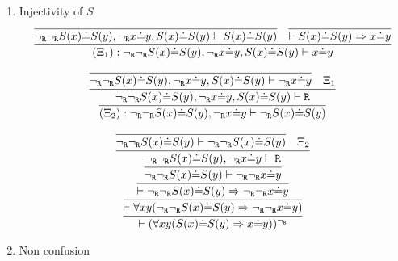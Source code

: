 \begin{enumerate}
    \item Injectivity of $S$
    $$    
                                \infer{
                                    (\Xi_1) : \ngr\ngr S(x)\dot{=}S(y), \ngr x\dot{=}y, S(x)\dot{=}S(y)  \vdash x\dot{=}y
                                }{
                                    \infer{
                                        \ngr\ngr S(x)\dot{=}S(y), \ngr x\dot{=}y, S(x)\dot{=}S(y)  \vdash S(x)\dot{=}S(y) 
                                    }{
                                    }&
                                    \infer{
                                        \vdash S(x)\dot{=}S(y) \Rightarrow x\dot{=}y
                                    }{
                                    }
                                }
    $$
    
    
    $$
    \infer{
                            (\Xi_2) : \ngr\ngr S(x)\dot{=}S(y), \ngr x\dot{=}y \vdash \ngr S(x)\dot{=}S(y) 
                        }{
                            \infer{
                                \ngr\ngr S(x)\dot{=}S(y), \ngr x\dot{=}y, S(x)\dot{=}S(y)  \vdash\R 
                            }{
                                \infer{
                                    \ngr\ngr S(x)\dot{=}S(y), \ngr x\dot{=}y, S(x)\dot{=}S(y)  \vdash\ngr x\dot{=}y
                                }{
                                }&
                                \Xi_1
                            }
                        }
    $$    
    
    $$
    \infer{
        \vdash (\forall xy (S(x)\dot{=}S(y) \Rightarrow x\dot{=}y))^\ngr
    }{
        \infer{
            \vdash \forall xy (\ngr\ngr S(x)\dot{=}S(y) \Rightarrow \ngr\ngr x\dot{=}y)
        }{
            \infer{
                \vdash \ngr\ngr S(x)\dot{=}S(y) \Rightarrow \ngr\ngr x\dot{=}y
            }{
                \infer{
                    \ngr\ngr S(x)\dot{=}S(y) \vdash\ngr\ngr x\dot{=}y
                }{
                    \infer{
                        \ngr\ngr S(x)\dot{=}S(y), \ngr x\dot{=}y \vdash \R 
                    }{
                        \infer{
                            \ngr\ngr S(x)\dot{=}S(y) \vdash \ngr\ngr S(x)\dot{=}S(y) 
                        }{
                        }&
                        \Xi_2
                    }
                }
            }
        }
    }
    $$
    
    \item Non confusion
    

\end{enumerate}

